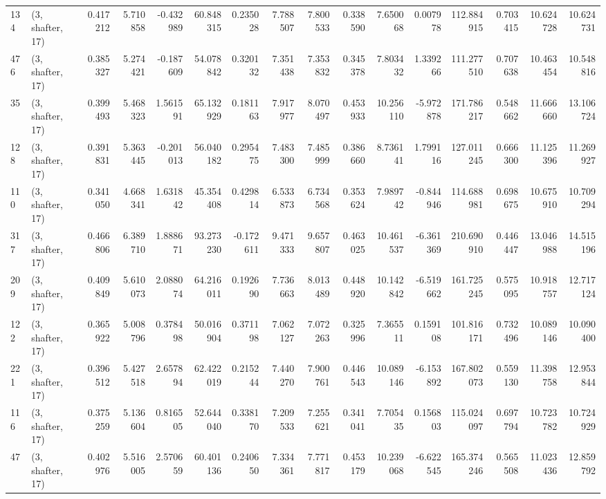 \begin{tabular}{llrrrrrrrrrrrrrr}
134 &  (3, shafter, 17) &   0.417212 &   5.710858 &  -0.432989 &    60.848315 &   0.235028 &   7.788507 &   7.800533 &  0.338590 &   7.650068 &   0.007978 &   112.884915 &   0.703415 &  10.624728 &  10.624731 \\
476 &  (3, shafter, 17) &   0.385327 &   5.274421 &  -0.187609 &    54.078842 &   0.320132 &   7.351438 &   7.353832 &  0.345378 &   7.803432 &   1.339266 &   111.277510 &   0.707638 &  10.463454 &  10.548816 \\
35  &  (3, shafter, 17) &   0.399493 &   5.468323 &   1.561591 &    65.132929 &   0.181163 &   7.917977 &   8.070497 &  0.453933 &  10.256110 &  -5.972878 &   171.786217 &   0.548662 &  11.666660 &  13.106724 \\
128 &  (3, shafter, 17) &   0.391831 &   5.363445 &  -0.201013 &    56.040182 &   0.295475 &   7.483300 &   7.485999 &  0.386660 &   8.736141 &   1.799116 &   127.011245 &   0.666300 &  11.125396 &  11.269927 \\
110 &  (3, shafter, 17) &   0.341050 &   4.668341 &   1.631842 &    45.354408 &   0.429814 &   6.533873 &   6.734568 &  0.353624 &   7.989742 &  -0.844946 &   114.688981 &   0.698675 &  10.675910 &  10.709294 \\
317 &  (3, shafter, 17) &   0.466806 &   6.389710 &   1.888671 &    93.273230 &  -0.172611 &   9.471333 &   9.657807 &  0.463025 &  10.461537 &  -6.361369 &   210.690910 &   0.446447 &  13.046988 &  14.515196 \\
209 &  (3, shafter, 17) &   0.409849 &   5.610073 &   2.088074 &    64.216011 &   0.192690 &   7.736663 &   8.013489 &  0.448920 &  10.142842 &  -6.519662 &   161.725245 &   0.575095 &  10.918757 &  12.717124 \\
122 &  (3, shafter, 17) &   0.365922 &   5.008796 &   0.378498 &    50.016904 &   0.371198 &   7.062127 &   7.072263 &  0.325996 &   7.365511 &   0.159108 &   101.816171 &   0.732496 &  10.089146 &  10.090400 \\
221 &  (3, shafter, 17) &   0.396512 &   5.427518 &   2.657894 &    62.422019 &   0.215244 &   7.440270 &   7.900761 &  0.446543 &  10.089146 &  -6.153892 &   167.802073 &   0.559130 &  11.398758 &  12.953844 \\
116 &  (3, shafter, 17) &   0.375259 &   5.136604 &   0.816505 &    52.644040 &   0.338170 &   7.209533 &   7.255621 &  0.341041 &   7.705435 &   0.156803 &   115.024097 &   0.697794 &  10.723782 &  10.724929 \\
47  &  (3, shafter, 17) &   0.402976 &   5.516005 &   2.570659 &    60.401136 &   0.240650 &   7.334361 &   7.771817 &  0.453179 &  10.239068 &  -6.622545 &   165.374246 &   0.565508 &  11.023436 &  12.859792 \\

\end{tabular}
